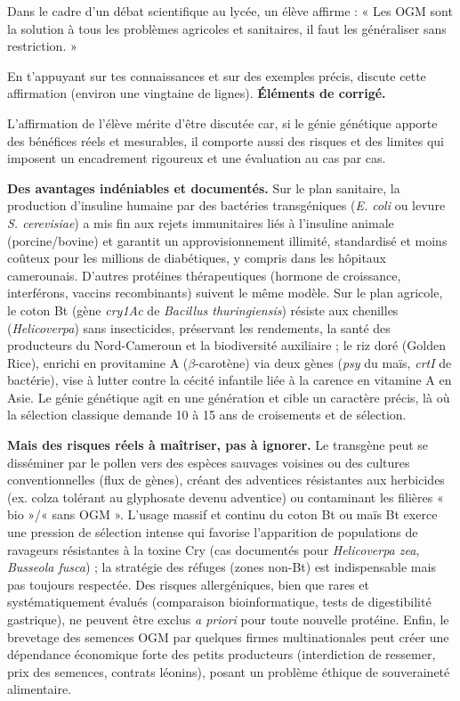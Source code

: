 \documentclass[11pt]{article}
\newcommand{\cle}[1]{{\popxbold\color{popdark}#1}}
\begin{document}
\begin{exoresolu}
Dans le cadre d'un débat scientifique au lycée, un élève affirme : « Les OGM sont la solution à tous les problèmes agricoles et sanitaires, il faut les généraliser sans restriction. »

En t'appuyant sur tes connaissances et sur des exemples précis, discute cette affirmation (environ une vingtaine de lignes).
\tcblower
\textbf{Éléments de corrigé.}

L'affirmation de l'élève mérite d'être discutée car, si le génie génétique apporte des bénéfices réels et mesurables, il comporte aussi des risques et des limites qui imposent un encadrement rigoureux et une évaluation au cas par cas.

\textbf{Des avantages indéniables et documentés.} Sur le plan sanitaire, la production d'\cle{insuline humaine} par des bactéries transgéniques (\emph{E. coli} ou levure \emph{S. cerevisiae}) a mis fin aux rejets immunitaires liés à l'insuline animale (porcine/bovine) et garantit un approvisionnement illimité, standardisé et moins coûteux pour les millions de diabétiques, y compris dans les hôpitaux camerounais. D'autres protéines thérapeutiques (hormone de croissance, interférons, vaccins recombinants) suivent le même modèle. Sur le plan agricole, le \cle{coton Bt} (gène \emph{cry1Ac} de \emph{Bacillus thuringiensis}) résiste aux chenilles (\emph{Helicoverpa}) sans insecticides, préservant les rendements, la santé des producteurs du Nord-Cameroun et la biodiversité auxiliaire ; le \cle{riz doré} (Golden Rice), enrichi en provitamine A ($\beta$-carotène) via deux gènes (\emph{psy} du maïs, \emph{crtI} de bactérie), vise à lutter contre la cécité infantile liée à la carence en vitamine A en Asie. Le génie génétique agit en une génération et cible un caractère précis, là où la sélection classique demande 10 à 15 ans de croisements et de sélection.

\textbf{Mais des risques réels à maîtriser, pas à ignorer.} Le transgène peut se disséminer par le pollen vers des espèces sauvages voisines ou des cultures conventionnelles (\cle{flux de gènes}), créant des adventices résistantes aux herbicides (ex. colza tolérant au glyphosate devenu adventice) ou contaminant les filières « bio »/« sans OGM ». L'usage massif et continu du coton Bt ou maïs Bt exerce une pression de sélection intense qui favorise l'apparition de \cle{populations de ravageurs résistantes} à la toxine Cry (cas documentés pour \emph{Helicoverpa zea}, \emph{Busseola fusca}) ; la stratégie des \cle{réfuges} (zones non-Bt) est indispensable mais pas toujours respectée. Des risques \cle{allergéniques}, bien que rares et systématiquement évalués (comparaison bioinformatique, tests de digestibilité gastrique), ne peuvent être exclus \emph{a priori} pour toute nouvelle protéine. Enfin, le brevetage des semences OGM par quelques firmes multinationales peut créer une dépendance économique forte des petits producteurs (interdiction de ressemer, prix des semences, contrats léonins), posant un problème éthique de souveraineté alimentaire.


\end{exoresolu}
\end{document}
